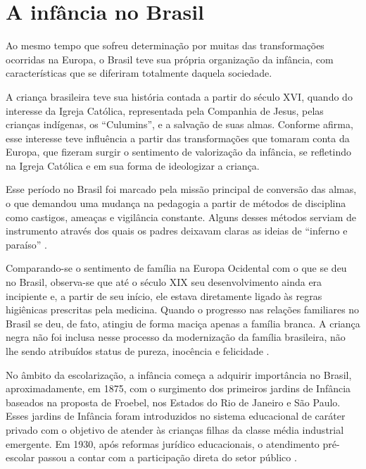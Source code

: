 \section{A infância no Brasil}

Ao mesmo tempo que sofreu determinação por muitas das transformações ocorridas na Europa, o Brasil teve sua própria organização da infância, com características que se diferiram totalmente daquela sociedade.

A criança brasileira teve sua história contada a partir do século XVI, quando do interesse da Igreja Católica, representada pela Companhia de Jesus, pelas crianças indígenas, os ``Culumins'', e a salvação de suas almas. Conforme  afirma, esse interesse teve influência a partir das transformações que tomaram conta da Europa, que fizeram surgir o sentimento de valorização da infância, se refletindo na Igreja Católica e em sua forma de ideologizar a criança.

Esse período no Brasil foi marcado pela missão principal de conversão das almas, o que demandou uma mudança na pedagogia a partir de métodos de disciplina como castigos, ameaças e vigilância constante. Alguns desses métodos serviam de instrumento através dos quais os padres deixavam claras as ideias de ``inferno e paraíso'' \cite[p. 37]{SANTOS1994}.

Comparando-se o sentimento de família na Europa Ocidental com o que se deu no Brasil, observa-se que até o século XIX seu desenvolvimento ainda era incipiente e, a partir de seu início, ele estava diretamente ligado às regras higiênicas prescritas pela medicina. Quando o progresso nas relações familiares no Brasil se deu, de fato, atingiu de forma maciça apenas a família branca. A criança negra não foi inclusa nesse processo da modernização da família brasileira, não lhe sendo atribuídos status de pureza, inocência e felicidade \cite{SANTOS1994}. 

No âmbito da escolarização, a infância começa a adquirir importância no Brasil, aproximadamente, em 1875, com o surgimento dos primeiros jardins de Infância baseados na proposta de Froebel\footnotemark, nos Estados do Rio de Janeiro e São Paulo. Esses jardins de Infância foram introduzidos no sistema educacional de caráter privado com o objetivo de atender às crianças filhas da classe média industrial emergente. Em 1930, após reformas jurídico educacionais, o atendimento pré-escolar passou a contar com a participação direta do setor público \cite{AHMAD2009}.

